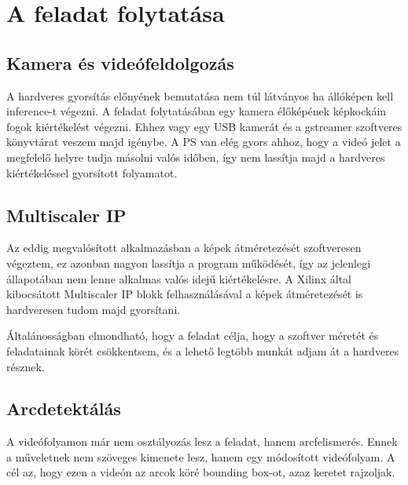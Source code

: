 \chapter{A feladat folytatása}

\section{Kamera és videófeldolgozás}
A hardveres gyorsítás előnyének bemutatása nem túl látványos ha állóképen kell inference-t végezni. A feladat folytatásában egy kamera élőképének képkockáin fogok kiértékelést végezni. Ehhez vagy egy USB kamerát és a gstreamer szoftveres könyvtárat veszem majd igénybe. A PS van elég gyors ahhoz, hogy a videó jelet a megfelelő helyre tudja másolni valós időben, így nem lassítja majd a hardveres kiértékeléssel gyorsított folyamatot.

\section{Multiscaler IP}
Az eddig megvalósított alkalmazásban a képek átméretezését szoftveresen végeztem, ez azonban nagyon lassítja a program működését, így az jelenlegi állapotában nem lenne alkalmas valós idejű kiértékelésre. A Xilinx által kibocsátott Multiscaler IP blokk felhasználásával a képek átméretezését is hardveresen tudom majd gyorsítani.

Általánosságban elmondható, hogy a feladat célja, hogy a szoftver méretét és feladatainak körét csökkentsem, és a lehető legtöbb munkát adjam át a hardveres résznek.

\section{Arcdetektálás}
A videófolyamon már nem osztályozás lesz a feladat, hanem arcfelismerés. Ennek a műveletnek nem szöveges kimenete lesz, hanem egy módosított videófolyam. A cél az, hogy ezen a videón az arcok köré bounding box-ot, azaz keretet rajzoljak.
